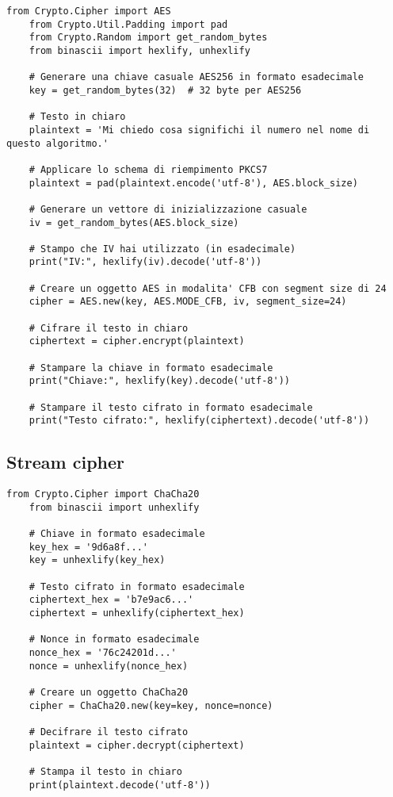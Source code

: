 \begin{lstlisting}[style=pythonStyle]
    from Crypto.Cipher import AES
    from Crypto.Util.Padding import pad
    from Crypto.Random import get_random_bytes
    from binascii import hexlify, unhexlify

    # Generare una chiave casuale AES256 in formato esadecimale
    key = get_random_bytes(32)  # 32 byte per AES256

    # Testo in chiaro
    plaintext = 'Mi chiedo cosa significhi il numero nel nome di questo algoritmo.'

    # Applicare lo schema di riempimento PKCS7
    plaintext = pad(plaintext.encode('utf-8'), AES.block_size)

    # Generare un vettore di inizializzazione casuale
    iv = get_random_bytes(AES.block_size)

    # Stampo che IV hai utilizzato (in esadecimale)
    print("IV:", hexlify(iv).decode('utf-8'))

    # Creare un oggetto AES in modalita' CFB con segment size di 24
    cipher = AES.new(key, AES.MODE_CFB, iv, segment_size=24)

    # Cifrare il testo in chiaro
    ciphertext = cipher.encrypt(plaintext)

    # Stampare la chiave in formato esadecimale
    print("Chiave:", hexlify(key).decode('utf-8'))

    # Stampare il testo cifrato in formato esadecimale
    print("Testo cifrato:", hexlify(ciphertext).decode('utf-8'))
\end{lstlisting}
\subsection{Stream cipher}
\begin{lstlisting}[style = pythonStyle]
    from Crypto.Cipher import ChaCha20
    from binascii import unhexlify

    # Chiave in formato esadecimale
    key_hex = '9d6a8f...'
    key = unhexlify(key_hex)

    # Testo cifrato in formato esadecimale
    ciphertext_hex = 'b7e9ac6...'
    ciphertext = unhexlify(ciphertext_hex)

    # Nonce in formato esadecimale
    nonce_hex = '76c24201d...'
    nonce = unhexlify(nonce_hex)

    # Creare un oggetto ChaCha20
    cipher = ChaCha20.new(key=key, nonce=nonce)

    # Decifrare il testo cifrato
    plaintext = cipher.decrypt(ciphertext)

    # Stampa il testo in chiaro
    print(plaintext.decode('utf-8'))
\end{lstlisting}

